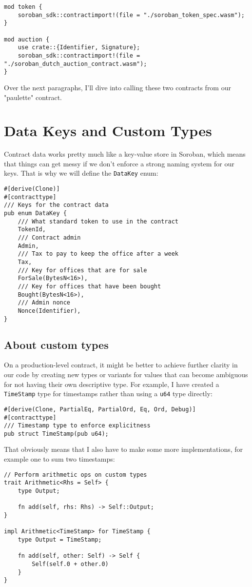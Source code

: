 \documentclass[10pt]{article}
\begin{document}
\begin{verbatim}
mod token {
    soroban_sdk::contractimport!(file = "./soroban_token_spec.wasm");
}

mod auction {
    use crate::{Identifier, Signature};
    soroban_sdk::contractimport!(file = "./soroban_dutch_auction_contract.wasm");
}
\end{verbatim}

Over the next paragraphs, I'll dive into calling these two contracts from our "paulette" contract.

\section*{Data Keys and Custom Types}
Contract data works pretty much like a key-value store in Soroban, which means that things can get messy if we don't enforce a strong naming system for our keys. That is why we will define the \texttt{DataKey} enum:

\begin{verbatim}
#[derive(Clone)]
#[contracttype]
/// Keys for the contract data
pub enum DataKey {
    /// What standard token to use in the contract
    TokenId,
    /// Contract admin
    Admin,
    /// Tax to pay to keep the office after a week
    Tax,
    /// Key for offices that are for sale
    ForSale(BytesN<16>),
    /// Key for offices that have been bought
    Bought(BytesN<16>),
    /// Admin nonce
    Nonce(Identifier),
}
\end{verbatim}

\subsection*{About custom types}
On a production-level contract, it might be better to achieve further clarity in our code by creating new types or variants for values that can become ambiguous for not having their own descriptive type. For example, I have created a \texttt{TimeStamp} type for timestamps rather than using a \texttt{u64} type directly:

\begin{verbatim}
#[derive(Clone, PartialEq, PartialOrd, Eq, Ord, Debug)]
#[contracttype]
/// Timestamp type to enforce explicitness
pub struct TimeStamp(pub u64);
\end{verbatim}

That obviously means that I also have to make some more implementations, for example one to sum two timestamps:

\begin{verbatim}
// Perform arithmetic ops on custom types
trait Arithmetic<Rhs = Self> {
    type Output;

    fn add(self, rhs: Rhs) -> Self::Output;
}

impl Arithmetic<TimeStamp> for TimeStamp {
    type Output = TimeStamp;

    fn add(self, other: Self) -> Self {
        Self(self.0 + other.0)
    }
}

\end{verbatim}
\end{document}
